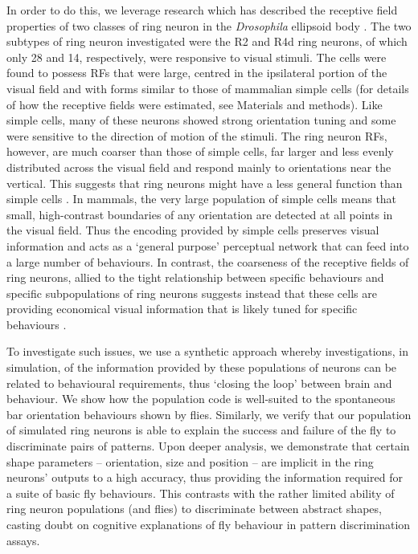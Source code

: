 In order to do this, we leverage research which has described the receptive field properties of two classes of ring neuron in the \emph{Drosophila} ellipsoid body \cite{Seelig2013}. The two subtypes of ring neuron investigated were the R2 and R4d ring neurons, of which only 28 and 14, respectively, were responsive to visual stimuli. The cells were found to possess \acp{RF} that were large, centred in the ipsilateral portion of the visual field and with forms similar to those of mammalian simple cells \cite{Hubel1962} (for details of how the receptive fields were estimated, see Materials and methods). Like simple cells, many of these neurons showed strong orientation tuning and some were sensitive to the direction of motion of the stimuli. The ring neuron \acp{RF}, however, are much coarser than those of simple cells, far larger and less evenly distributed across the visual field and respond mainly to orientations near the vertical. This suggests that ring neurons might have a less general function than simple cells \cite{Wystrach2014}. In mammals, the very large population of simple cells means that small, high-contrast boundaries of any orientation are detected at all points in the visual field. Thus the encoding provided by simple cells preserves visual information and acts as a `general purpose' perceptual network that can feed into a large number of behaviours. In contrast, the coarseness of the receptive fields of ring neurons, allied to the tight relationship between specific behaviours and specific subpopulations of ring neurons suggests instead that these cells are providing economical visual information that is likely tuned for specific behaviours \cite{Wystrach2014}.

To investigate such issues, we use a synthetic approach whereby investigations, in simulation, of the information provided by these populations of neurons can be related to behavioural requirements, thus `closing the loop' between brain and behaviour. We show how the population code is well-suited to the spontaneous bar orientation behaviours shown by flies. Similarly, we verify that our population of simulated ring neurons is able to explain the success and failure of the fly to discriminate pairs of patterns. Upon deeper analysis, we demonstrate that certain shape parameters -- orientation, size and position -- are implicit in the ring neurons' outputs to a high accuracy, thus providing the information required for a suite of basic fly behaviours. This contrasts with the rather limited ability of ring neuron populations (and flies) to discriminate between abstract shapes, casting doubt on cognitive explanations of fly behaviour in pattern discrimination assays.

